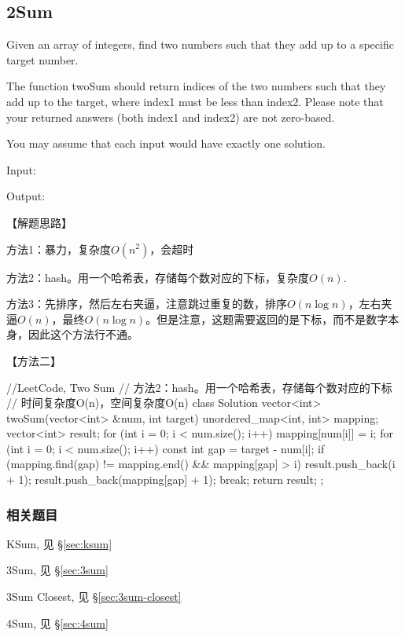 \subsection{2Sum} %
\label{sec:2sum}



Given an array of integers, find two numbers such that they add up to a
specific target number.

The function twoSum should return indices of the two numbers such that they add
up to the target, where index1 must be less than index2. Please note that your
returned answers (both index1 and index2) are not zero-based.

You may assume that each input would have exactly one solution.

Input:  

Output: 


【解题思路】

方法1：暴力，复杂度$O(n^2)$，会超时

方法2：hash。用一个哈希表，存储每个数对应的下标，复杂度$O(n)$.

方法3：先排序，然后左右夹逼，注意跳过重复的数，排序$O(n\log n)$，左右夹逼$O(n)$，最终$O(n\log
n)$。但是注意，这题需要返回的是下标，而不是数字本身，因此这个方法行不通。


【方法二】
\begin{Code}
	//LeetCode, Two Sum
	// 方法2：hash。用一个哈希表，存储每个数对应的下标
	// 时间复杂度O(n)，空间复杂度O(n)
	class Solution {
		vector<int> twoSum(vector<int> &num, int target) {
			unordered_map<int, int> mapping;
			vector<int> result;
			for (int i = 0; i < num.size(); i++)
				mapping[num[i]] = i;
			for (int i = 0; i < num.size(); i++) {
				const int gap = target - num[i];
				if (mapping.find(gap) != mapping.end() && mapping[gap] > i) {
					result.push_back(i + 1);
					result.push_back(mapping[gap] + 1);
					break;
				}
			}
			return result;
		}
	};
\end{Code}


\subsubsection{相关题目}
\begindot
\item KSum, 见 \S \ref{sec:ksum}
\item 3Sum, 见 \S \ref{sec:3sum}
\item 3Sum Closest, 见 \S \ref{sec:3sum-closest}
\item 4Sum, 见 \S \ref{sec:4sum}
\myenddot

